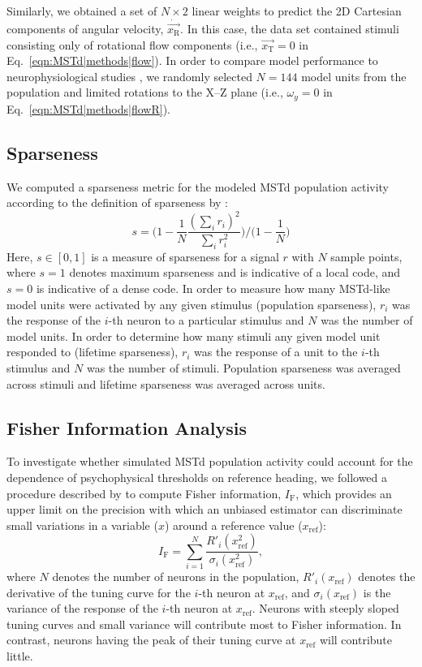 Similarly, we obtained a set of $N \times 2$ linear weights to predict the 
2D Cartesian components of angular velocity, $\dot{\vec{x_{\textrm{R}}}}$.
In this case, the data set contained stimuli consisting only of rotational 
flow components (i.e., $\vec{x_{\textrm{T}}} = 0$ in
Eq.~\ref{eqn:MSTd|methods|flow}).
In order to compare model performance to neurophysiological studies
\citep{BenHamed2003}, we randomly selected $N=144$ model units from the 
population and limited rotations to the X--Z plane (i.e., $\omega_y=0$ in
Eq.~\ref{eqn:MSTd|methods|flowR}).


\subsection{Sparseness}
\label{sec:MSTd|methods|sparseness}
We computed a sparseness metric for the modeled \ac{MSTd} population activity
according to the definition of sparseness by \cite{VinjeGallant2000}:
\begin{equation}
s = \bigg( 1 - \frac{1}{N} \frac{(\sum_i r_i)^2}{\sum_i r_i^2} \bigg) \bigg/ \bigg( 1 - \frac{1}{N} \bigg)
\label{eqn:MSTd|methods|sparseness}
\end{equation}
Here, $s \in [0,1]$ is a measure of sparseness for a signal $r$ with $N$ 
sample points, where $s=1$ denotes maximum sparseness and is indicative of 
a local code, and $s=0$ is indicative of a dense code. In order to measure 
how many \ac{MSTd}-like model units were activated by any given stimulus
(population sparseness), $r_i$ was the response of the $i$-th neuron to a
particular stimulus and $N$ was the number of model units. In order to 
determine how many stimuli any given model unit responded to (lifetime 
sparseness), $r_i$ was the response of a unit to the $i$-th stimulus and $N$
was the number of stimuli. Population sparseness was averaged across stimuli
and lifetime sparseness was averaged across units.


\subsection{Fisher Information Analysis}
\label{sec:MSTd|methods|fisher}
To investigate whether simulated \ac{MSTd} population activity could account 
for the dependence of psychophysical thresholds on reference heading, we 
followed a procedure described by \cite{Gu2010} to compute Fisher information,
$I_\mathrm{F}$, which provides an upper limit on the precision with which an
unbiased estimator can discriminate small variations in a variable ($x$) 
around a reference value ($x_{\mathrm{ref}}$):
\begin{equation}
I_{\mathrm{F}} = \sum_{i=1}^N \frac{R'_i(x_{\mathrm{ref}}^2)}{\sigma_i(x_{\mathrm{ref}}^2)},
\end{equation}
where $N$ denotes the number of neurons in the population, 
$R'_i(x_{\mathrm{ref}})$ denotes the derivative of the tuning curve for the 
$i$-th neuron at $x_{\mathrm{ref}}$, and $\sigma_i(x_{\mathrm{ref}})$ is the
variance of the response of the $i$-th neuron at $x_{\mathrm{ref}}$. 
Neurons with steeply sloped tuning curves and small variance will contribute
most to Fisher information. In contrast, neurons having the peak of their 
tuning curve at $x_{\mathrm{ref}}$ will contribute little.

